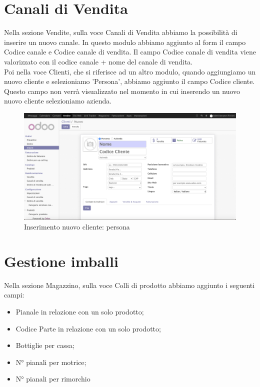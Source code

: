 \newpage
\section{Canali di Vendita}
Nella sezione Vendite, sulla voce Canali di Vendita abbiamo la possibilità di inserire un nuovo canale.
In questo modulo abbiamo aggiunto al form il campo Codice canale e Codice canale di vendita.
Il campo Codice canale di vendita viene valorizzato con il codice canale + nome del canale di vendita.\\
Poi nella voce Clienti, che si riferisce ad un altro modulo, quando aggiungiamo un nuovo cliente e selezioniamo 'Persona', abbiamo aggiunto il campo Codice cliente. Questo campo non verrà visualizzato nel momento in cui inserendo un nuovo nuovo cliente selezioniamo azienda.

\begin{figure}[H]
	\begin{center} \includegraphics[scale=0.3]{figures/ibg_code}
		\caption[Inserimento nuovo cliente: persona]{Inserimento nuovo cliente: persona}
		\label{fig:ibg_code}
	\end{center}
\end{figure}
\newpage

\section{Gestione imballi}
Nella sezione Magazzino, sulla voce Colli di prodotto abbiamo aggiunto i seguenti campi:
\begin{itemize}
\item Pianale in relazione con un solo prodotto;
\item Codice Parte in relazione con un solo prodotto;
\item Bottiglie per cassa;
\item N° pianali per motrice;
\item N° pianali per rimorchio
\end{itemize}

